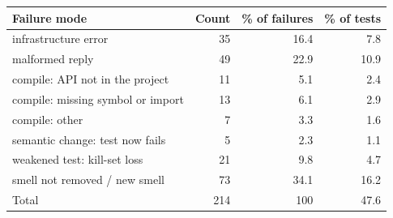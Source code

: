 \begin{tabular}{lrrr}
\toprule
Failure mode & Count & \% of failures & \% of tests \\
\midrule
infrastructure error & 35 & 16.4 & 7.8 \\
malformed reply & 49 & 22.9 & 10.9 \\
compile: API not in the project & 11 & 5.1 & 2.4 \\
compile: missing symbol or import & 13 & 6.1 & 2.9 \\
compile: other & 7 & 3.3 & 1.6 \\
semantic change: test now fails & 5 & 2.3 & 1.1 \\
weakened test: kill-set loss & 21 & 9.8 & 4.7 \\
smell not removed / new smell & 73 & 34.1 & 16.2 \\
\midrule
Total & 214 & 100 & 47.6 \\
\bottomrule
\end{tabular}
